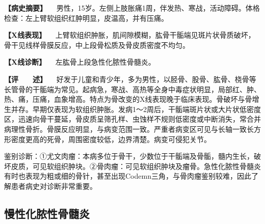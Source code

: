 \textbf{【病史摘要】}
　男性，15岁。左侧上肢胀痛1周，伴发热、寒战，活动障碍。体格检查：左上臂软组织红肿明显，皮温高，并有压痛。

\textbf{【X线表现】}
　上臂软组织肿胀，肌间隙模糊，肱骨干骺端见斑片状骨质破坏，骨干见线样骨膜反应，中上段骨松质及骨皮质密度不均匀。

\textbf{【X线诊断】} 　左肱骨上段急性化脓性骨髓炎。

\textbf{【评　　述】}
　好发于儿童和青少年，多为男性，以胫骨、股骨、肱骨、桡骨等长管骨的干骺端为常见。起病急，寒战、高热等全身中毒症状明显，局部红、肿、热、痛，压痛，血象增高。特点为骨改变的X线表现晚于临床表现。骨破坏与骨增生并存。早期仅表现为软组织肿胀。发病1～2周后，干骺端斑片状或大片状低密度区，迅速向骨干蔓延，骨皮质呈筛孔样、虫蚀样不规则低密度或中断消失，常合并病理性骨折。骨膜反应明显，与病变范围一致。严重者病变区可见与长轴一致长方形密度更高的死骨，周围密度较低，边界清楚。病变可侵犯关节。

鉴别诊断：①尤文肉瘤：本病多位于骨干，少数位于干骺端及骨骺，髓内生长，破坏皮质，可见软组织肿块。②骨肉瘤：可见软组织肿块及瘤骨。急性化脓性骨髓炎有时也表现为粗或细的骨针，甚至出现Codemn三角，与骨肉瘤鉴别较难，因此了解患者病史对诊断非常重要。

\subsection{慢性化脓性骨髓炎}

